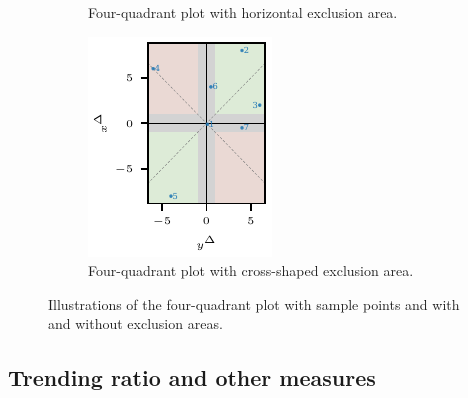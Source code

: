 \documentclass[pdflatex]{sn-jnl}
\theoremstyle{plain}%
\theoremstyle{definition}
\begin{document}
\begin{figure}
\begin{subfigure}[t]{.24\textwidth}
\caption{Four-quadrant plot with horizontal exclusion area.} \label{fig:trending_basic_4q_excl_axis}
\end{subfigure}\hspace{0.01\textwidth}%
\begin{subfigure}[t]{.24\textwidth}
\includegraphics{plots/illustrative_examples/4q_excl_cross}
\caption{Four-quadrant plot with cross-shaped exclusion area.}\label{fig:trending_basic_4q_excl_cross}
\end{subfigure}%
\caption{Illustrations of the four-quadrant plot with sample points and with and without exclusion areas. }
\label{fig:trending_4q}
\end{figure}

\subsection{Trending ratio and other measures}\label{subsec:trending-measures}
\end{document}
